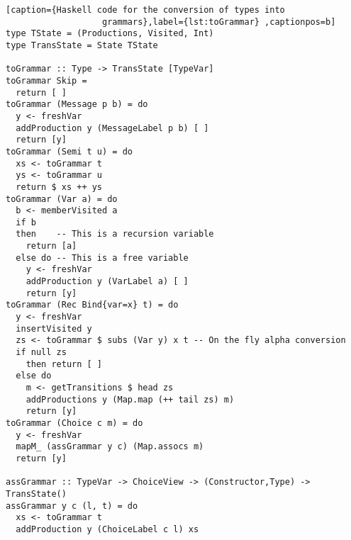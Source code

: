 \begin{lstlisting}[caption={Haskell code for the conversion of types into
                   grammars},label={lst:toGrammar} ,captionpos=b]
type TState = (Productions, Visited, Int)
type TransState = State TState

toGrammar :: Type -> TransState [TypeVar]
toGrammar Skip =
  return [ ]
toGrammar (Message p b) = do
  y <- freshVar
  addProduction y (MessageLabel p b) [ ]
  return [y]
toGrammar (Semi t u) = do
  xs <- toGrammar t
  ys <- toGrammar u
  return $ xs ++ ys
toGrammar (Var a) = do
  b <- memberVisited a
  if b
  then    -- This is a recursion variable
    return [a]
  else do -- This is a free variable
    y <- freshVar
    addProduction y (VarLabel a) [ ]
    return [y]
toGrammar (Rec Bind{var=x} t) = do
  y <- freshVar
  insertVisited y
  zs <- toGrammar $ subs (Var y) x t -- On the fly alpha conversion
  if null zs
    then return [ ]
  else do
    m <- getTransitions $ head zs
    addProductions y (Map.map (++ tail zs) m)
    return [y]
toGrammar (Choice c m) = do
  y <- freshVar
  mapM_ (assGrammar y c) (Map.assocs m)
  return [y]
  
assGrammar :: TypeVar -> ChoiceView -> (Constructor,Type) -> TransState()
assGrammar y c (l, t) = do
  xs <- toGrammar t
  addProduction y (ChoiceLabel c l) xs
\end{lstlisting}

